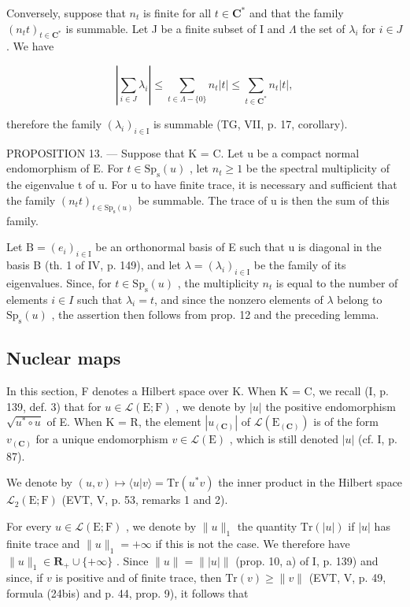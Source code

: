 Conversely, suppose that \(n_{t}\) is finite for all \(t \in \mathbf{C}^{*}\) and that the family \((n_{t}t)_{t \in \mathbf{C}^{*}}\) is summable. Let J be a finite subset of I and \(\Lambda\) the set of \(\lambda_{i}\) for \(i \in J\) . We have

\[
\left| \sum_ {i \in J} \lambda_ {i} \right| \leqslant \sum_ {t \in \Lambda - \{0 \}} n _ {t} | t | \leqslant \sum_ {t \in \mathbf {C} ^ {*}} n _ {t} | t |,
\]

therefore the family \((\lambda_{i})_{i\in\mathrm{I}}\) is summable (TG, VII, p. 17, corollary).

PROPOSITION 13. --- Suppose that K = C. Let u be a compact normal endomorphism of E. For \(t \in \mathrm{Sp}_{\mathrm{s}}(u)\) , let \(n_{t} \geqslant 1\) be the spectral multiplicity of the eigenvalue t of u. For u to have finite trace, it is necessary and sufficient that the family \((n_{t}t)_{t \in \mathrm{Sp}_{\mathrm{s}}(u)}\) be summable. The trace of u is then the sum of this family.

Let \(\mathrm{B} = (e_i)_{i \in \mathrm{I}}\) be an orthonormal basis of E such that u is diagonal in the basis B (th. 1 of IV, p. 149), and let \(\lambda = (\lambda_i)_{i \in \mathrm{I}}\) be the family of its eigenvalues. Since, for \(t \in \mathrm{Sp}_\mathrm{s}(u)\) , the multiplicity \(n_t\) is equal to the number of elements \(i \in I\) such that \(\lambda_i = t\), and since the nonzero elements of \(\lambda\) belong to \(\mathrm{Sp}_{\mathrm{s}}(u)\) , the assertion then follows from prop. 12 and the preceding lemma.

\subsection{Nuclear maps}

In this section, F denotes a Hilbert space over K. When K = C, we recall (I, p. 139, def. 3) that for \(u \in \mathcal{L}(\mathrm{E}; \mathrm{F})\) , we denote by \(|u|\) the positive endomorphism \(\sqrt{u^{*} \circ u}\) of E. When K = R, the element \(|u_{(\mathbf{C})}|\) of \(\mathcal{L}(\mathrm{E}_{(\mathbf{C})})\) is of the form \(v_{(\mathbf{C})}\) for a unique endomorphism \(v \in \mathcal{L}(\mathrm{E})\) , which is still denoted \(|u|\) (cf. I, p. 87).

We denote by \((u,v)\mapsto\langle u|v\rangle=\mathrm{Tr}(u^{*}v)\) the inner product in the Hilbert space \(\mathcal{L}_{2}(\mathrm{E};\mathrm{F})\) (EVT, V, p. 53, remarks 1 and 2).

For every \(u \in \mathcal{L}(\mathrm{E};\mathrm{F})\) , we denote by \(\| u\| _1\) the quantity \(\mathrm{Tr}(|u|)\) if \(|u|\) has finite trace and \(\| u\| _1 = +\infty\) if this is not the case. We therefore have \(\| u\| _1 \in \mathbf{R}_+ \cup \{+\infty\}\) . Since \(\| u\| = \| |u|\|\) (prop. 10, a) of I, p. 139) and since, if \(v\) is positive and of finite trace, then \(\mathrm{Tr}(v) \geqslant \| v\|\) (EVT, V, p. 49, formula (24bis) and p. 44, prop. 9), it follows that

